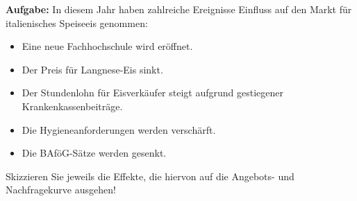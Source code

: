 \textbf{Aufgabe:}  
In diesem Jahr haben zahlreiche Ereignisse Einfluss auf den Markt für italienisches Speiseeis genommen:

\begin{itemize}
    \item Eine neue Fachhochschule wird eröffnet.
    \item Der Preis für Langnese-Eis sinkt.
    \item Der Stundenlohn für Eisverkäufer steigt aufgrund gestiegener Krankenkassenbeiträge.
    \item Die Hygieneanforderungen werden verschärft.
    \item Die BAföG-Sätze werden gesenkt.
\end{itemize}

Skizzieren Sie jeweils die Effekte, die hiervon auf die Angebots- und Nachfragekurve ausgehen!


